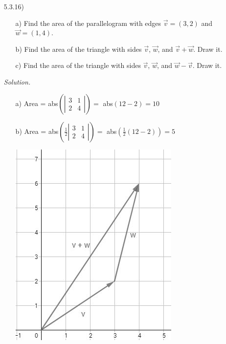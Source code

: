 \documentclass[12pt,pdftex]{article}
\begin{document}
\begin{itemize}
\item[5.3.16)] \begin{itemize}
\item[a)] Find the area of the parallelogram with edges $\vec{v}=(3,2)$ and $\vec{w}=(1,4)$.
\item[b)] Find the area of the triangle with sides $\vec{v}$, $\vec{w}$, and $\vec{v}+\vec{w}$. Draw it.
\item[c)] Find the area of the triangle with sides $\vec{v}$, $\vec{w}$, and $\vec{w}-\vec{v}$. Draw it.
\end{itemize}

\textit{Solution.}
\begin{itemize}
\item[a)] Area = abs$\left(\left|\begin{matrix} 3 & 1 \\ 2 & 4\end{matrix}\right|\right)=$ abs$(12-2)=10$

\item[b)] Area = abs$\left(\frac{1}{2}\left|\begin{matrix} 3 & 1 \\ 2 & 4\end{matrix}\right|\right)=$ abs$(\frac{1}{2}(12-2))=5$ \\ \begin{center}
\includegraphics[scale=0.52333]{triangle1.JPG}
\end{center}


\end{itemize}
\end{itemize}
\end{document}
